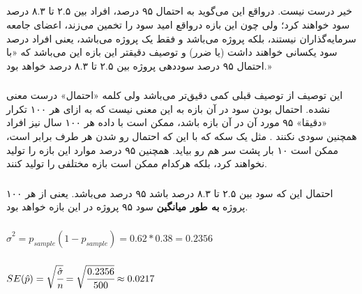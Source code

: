 \documentclass[12pt]{article}
\begin{document}
\subsection*{}
\subsubsection*{}
خیر درست نیست. درواقع این می‌گوید به احتمال ۹۵ درصد، افراد بین ۲.۵ تا ۸.۳ درصد سود خواهند کرد؛ ولی چون این بازه درواقع امید سود را تخمین می‌زند، اعضای جامعه سرمایه‌گذاران نیستند، بلکه پروژه می‌باشد و فقط یک پروژه می‌باشد، یعنی افراد درصد سود یکسانی خواهند داشت (یا ضرر) و توصیف دقیقتر این بازه این می‌باشد که «با احتمال ۹۵ درصد سوددهی پروژه بین ۲.۵ تا ۸.۳ درصد خواهد بود.»
\subsubsection*{}
این توصیف از توصیف قبلی کمی دقیق‌تر می‌باشد ولی کلمه «احتمال» درست معنی نشده. احتمال بودن سود در آن بازه به این معنی نیست که به ازای هر ۱۰۰ تکرار «دقیقا» ۹۵ مورد آن در آن بازه باشد،‌ ممکن است با داده هر ۱۰۰ سال نیز افراد همچنین سودی نکنند . مثل یک سکه که با این که احتمال رو شدن هر طرف برابر است، ممکن است ۱۰ بار پشت سر هم رو بیاید. همچنین ۹۵ درصد موارد این بازه را تولید نخواهند کرد، بلکه هرکدام ممکن است بازه مختلفی را تولید کنند. 
\subsubsection*{}
احتمال این که سود بین ۲.۵ تا ۸.۳ درصد باشد ۹۵ درصد می‌باشد. یعنی از هر ۱۰۰ پروژه 
\textbf{به طور میانگین}
سود ۹۵ پروژه در این بازه خواهد بود.
	
\subsubsection{}
\begin{latin}
	$\hat{\sigma}^2 = p_{sample}(1 - p_{sample})= 0.62 * 0.38 = 0.2356$
\end{latin}
\subsubsection{}
\begin{latin}
	$
	SE(\hat{p}) = \sqrt{\cfrac{\hat{\sigma}}{n}} = \sqrt{\cfrac{0.2356}{500}} \approx 0.0217
	$
\end{latin}
\end{document}
